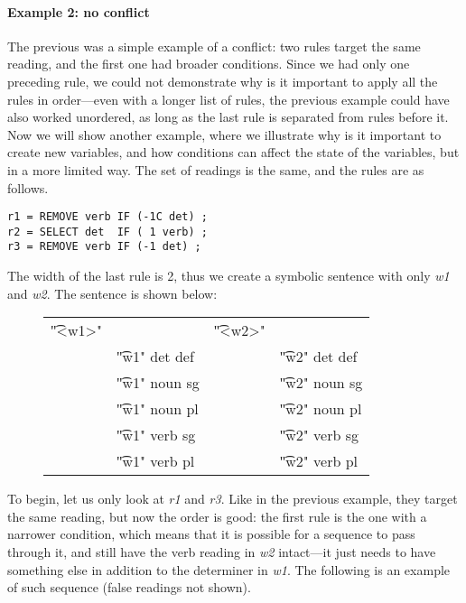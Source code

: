 \paragraph{Example 2: no conflict}
The previous was a simple example of a conflict: two rules target the same reading, and the first one had broader conditions. 
Since we had only one preceding rule, we could not demonstrate why is it important to apply all the rules in order---even with a longer list of rules, the previous example could have also worked unordered, as long as the last rule is separated from rules before it.
Now we will show another example, where we illustrate why is it important to create new variables, and how conditions can affect the state of the variables, but in a more limited way. The set of readings is the same, and the rules are as follows.

\begin{verbatim}
r1 = REMOVE verb IF (-1C det) ;
r2 = SELECT det  IF ( 1 verb) ;
r3 = REMOVE verb IF (-1 det) ;
\end{verbatim}

\noindent The width of the last rule is 2, thus we create a symbolic sentence with only {\em w1} and {\em w2}. The sentence is shown below:

\begin{figure}[h]
\centering 
\begin{tabular}{p{0.6cm} l  p{0.6cm} l }
\t{"<w1>"}    &                     &  \t{"<w2>"}  &           \\
              & \t{"w1" det def}    & &      \t{"w2" det def}  \\
              & \t{"w1" noun sg}    & &      \t{"w2" noun sg}  \\
              & \t{"w1" noun pl}    & &      \t{"w2" noun pl}  \\
              & \t{"w1" verb sg}    & &      \t{"w2" verb sg}  \\
              & \t{"w1" verb pl}    & &      \t{"w2" verb pl}  \\
\end{tabular}
\end{figure}


To begin, let us only look at {\em r1} and {\em r3}. Like in the previous example, they target the same reading, but now the order is good: the first rule is the one with a narrower condition, which means that it is possible for a sequence to pass through it, and still have the verb reading in {\em w2} intact---it just needs to have something else in addition to the determiner in {\em w1}.
The following is an example of such sequence (false readings not shown). %


